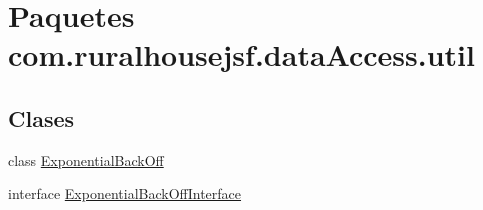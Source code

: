 \hypertarget{namespacecom_1_1ruralhousejsf_1_1data_access_1_1util}{}\section{Paquetes com.\+ruralhousejsf.\+data\+Access.\+util}
\label{namespacecom_1_1ruralhousejsf_1_1data_access_1_1util}
\subsection*{Clases}
\begin{DoxyCompactItemize}
\item 
class \mbox{\hyperlink{classcom_1_1ruralhousejsf_1_1data_access_1_1util_1_1_exponential_back_off}{Exponential\+Back\+Off}}
\item 
interface \mbox{\hyperlink{interfacecom_1_1ruralhousejsf_1_1data_access_1_1util_1_1_exponential_back_off_interface}{Exponential\+Back\+Off\+Interface}}
\end{DoxyCompactItemize}
